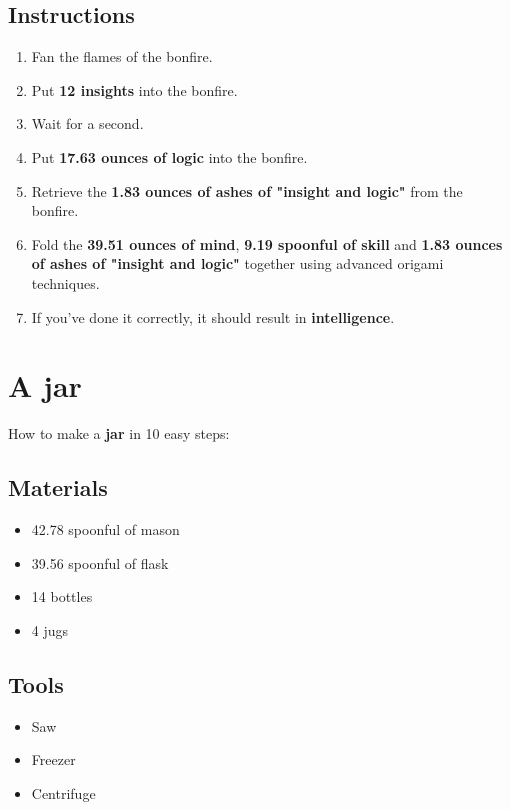 \documentclass{article}
\begin{document}
\subsection{Instructions}\begin{enumerate}
\item 
Fan the flames of the bonfire.
\item 
Put \textbf{12 insights} into the bonfire.
\item 
Wait for a second.
\item 
Put \textbf{17.63 ounces of logic} into the bonfire.
\item 
Retrieve the \textbf{1.83 ounces of ashes of "insight and logic"} from the bonfire.
\item 
Fold the \textbf{39.51 ounces of mind}, \textbf{9.19 spoonful of skill} and \textbf{1.83 ounces of ashes of "insight and logic"} together using advanced origami techniques.
\item 
If you've done it correctly, it should result in \textbf{intelligence}.
\end{enumerate}
\newpage
\section{A jar}How to make a \textbf{jar} in 10 easy steps:

\subsection{Materials}\begin{itemize}
\item 
42.78 spoonful of mason
\item 
39.56 spoonful of flask
\item 
14 bottles
\item 
4 jugs
\end{itemize}
\subsection{Tools}\begin{itemize}
\item 
Saw
\item 
Freezer
\item 
Centrifuge
\end{itemize}
\end{document}
